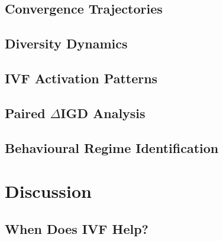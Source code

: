 \documentclass[runningheads]{llncs}
\begin{document}
\subsection{Convergence Trajectories}


\subsection{Diversity Dynamics}


\subsection{IVF Activation Patterns}


\subsection{Paired $\Delta$IGD Analysis}


\subsection{Behavioural Regime Identification}



\section{Discussion}
\label{sec:discussion}


\subsection{When Does IVF Help?}

\end{document}
